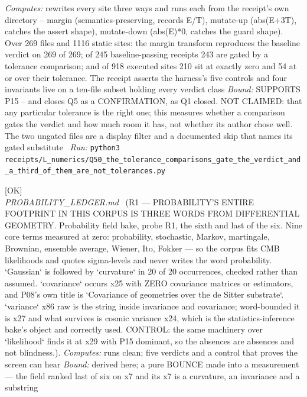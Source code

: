 \begin{description}
\emph{Computes:} rewrites every site three ways and runs each from the receipt's own directory -- margin (semantics-preserving, records E/T), mutate-up (abs(E+3T), catches the assert shape), mutate-down (abs(E)*0, catches the guard shape). Over 269 files and 1116 static sites: the margin transform reproduces the baseline verdict on 269 of 269; of 245 baseline-passing receipts 243 are gated by a tolerance comparison; and of 918 executed sites 210 sit at exactly zero and 54 at or over their tolerance. The receipt asserts the harness's five controls and four invariants live on a ten-file subset holding every verdict class
 \emph{Bound:} SUPPORTS P15 -- and closes Q5 as a CONFIRMATION, as Q1 closed. NOT CLAIMED: that any particular tolerance is the right one; this measures whether a comparison gates the verdict and how much room it has, not whether its author chose well. The two ungated files are a display filter and a documented skip that names its gated substitute
\ \emph{Run:} \texttt{python3 receipts/L\_numerics/Q50\_the\_tolerance\_comparisons\_gate\_the\_verdict\_and\_a\_third\_of\_them\_are\_not\_tolerances.py}
\item[\label{rcpt:R1_the_whole_footprint_is_three_geometry_words}\texttt{R1\_the\_whole\_footprint\_is\_three\_geometry\_words}]\hfill\textsf{[OK]}\\
\textit{PROBABILITY\_LEDGER.md} \ (R1 --- PROBABILITY'S ENTIRE FOOTPRINT IN THIS CORPUS IS THREE WORDS FROM DIFFERENTIAL GEOMETRY. Probability field bake, probe R1, the sixth and last of the six. Nine core terms measured at zero: probability, stochastic, Markov, martingale, Brownian, ensemble average, Wiener, Ito, Fokker --- so the corpus fits CMB likelihoods and quotes sigma-levels and never writes the word probability. `Gaussian` is followed by `curvature` in 20 of 20 occurrences, checked rather than assumed. `covariance` occurs x25 with ZERO covariance matrices or estimators, and P08's own title is `Covariance of geometries over the de Sitter substrate`. `variance` x86 raw is the string inside invariance and covariance; word-bounded it is x27 and what survives is cosmic variance x24, which is the statistics-inference bake's object and correctly used. CONTROL: the same machinery over `likelihood` finds it at x29 with P15 dominant, so the absences are absences and not blindness.). 
\emph{Computes:} runs clean; five verdicts and a control that proves the screen can hear
 \emph{Bound:} derived here; a pure BOUNCE made into a measurement --- the field ranked last of six on x7 and its x7 is a curvature, an invariance and a substring

\end{description}
